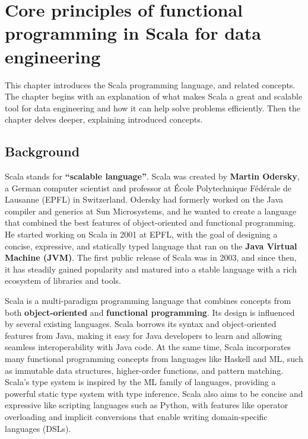 \chapter{ Core principles of functional programming in Scala for data engineering }

This chapter introduces the Scala programming language, and related concepts. The chapter begins with an explanation of what makes Scala a great and scalable tool for data engineering and how it can help solve problems efficiently. Then the chapter delves deeper, explaining introduced concepts.

\section{Background}

Scala stands for \textbf{“scalable language”}. Scala was created by \textbf{Martin Odersky}, a German computer scientist and professor at École Polytechnique Fédérale de Lausanne (EPFL) in Switzerland. Odersky had formerly worked on the Java compiler and generics at Sun Microsystems, and he wanted to create a language that combined the best features of object-oriented and functional programming. He started working on Scala in 2001 at EPFL, with the goal of designing a concise, expressive, and statically typed language that ran on the \textbf{Java Virtual Machine (JVM)}. The first public release of Scala was in 2003, and since then, it has steadily gained popularity and matured into a stable language with a rich ecosystem of libraries and tools.\footnotemark {}

Scala is a multi-paradigm programming language that combines concepts from both \textbf{object-oriented} and \textbf{functional programming}. Its design is influenced by several existing languages. Scala borrows its syntax and object-oriented features from Java, making it easy for Java developers to learn and allowing seamless interoperability with Java code. At the same time, Scala incorporates many functional programming concepts from languages like Haskell and ML, such as immutable data structures, higher-order functions, and pattern matching. Scala's type system is inspired by the ML family of languages, providing a powerful static type system with type inference. Scala also aims to be concise and expressive like scripting languages such as Python, with features like operator overloading and implicit conversions that enable writing domain-specific languages (DSLs).\footnotemark {} \footnotemark {} \footnotemark {}

